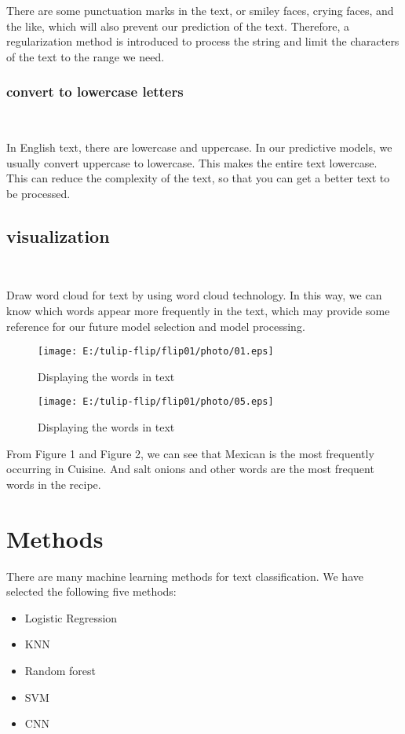 There are some punctuation marks in the text, or smiley faces, crying faces, and the like, 
which will also prevent our prediction of the text. Therefore, a regularization method is 
introduced to process the string and limit the characters of the text to the range we need.

\subsubsection{convert to lowercase letters}
\

In English text, there are lowercase and uppercase. In our predictive models, we usually convert 
uppercase to lowercase. This makes the entire text lowercase. This can reduce the complexity of the text, 
so that you can get a better text to be processed.

\subsection{visualization}
\ 

Draw word cloud for text by using word cloud technology. In this way, we can know which words 
appear more frequently in the text, which may provide some reference for our future model selection and model processing.

\begin{figure}[ht]%
	\centering%
	\texttt{[image: E:/tulip-flip/flip01/photo/01.eps]}
	\caption{Displaying the words in text}%
\end{figure} 

\begin{figure}[ht]%
	\centering%
	\texttt{[image: E:/tulip-flip/flip01/photo/05.eps]}
	\caption{Displaying the words in text}%
\end{figure}
\vspace{2cm}
From Figure 1 and Figure 2, we can see that Mexican is the most frequently occurring in Cuisine.
And salt onions and other words are the most frequent words in the recipe.

\section{Methods}

There are many machine learning methods for text classification. We have selected the following five methods:
\begin{itemize}
	\item  Logistic Regression
	\item  KNN
	\item  Random forest
	\item  SVM
	\item  CNN
  \end{itemize}
